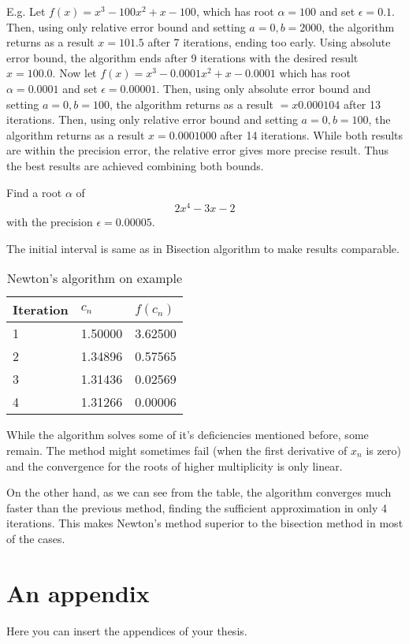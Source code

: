 \documentclass[
  digital, %
  table,   %
  nolof,     %
  nolot,     %
	draft, %
]{fithesis3}
\begin{document}
E.g. Let $f(x)=x^3-100x^2+x-100$, which has root $\alpha=100$ and set $\epsilon=0.1$. Then, using only relative error bound and setting $a=0, b=2000$, the algorithm returns as a result $x=101.5$ after 7 iterations, ending too early. Using absolute error bound, the algorithm ends after 9 iterations with the desired result $x=100.0$. 
Now let $f(x)=x^3-0.0001x^2+x-0.0001$ which has root $\alpha=0.0001$ and set $\epsilon=0.00001$. Then, using only absolute error bound and setting $a=0, b=100$, the algorithm returns as a result $=x0.000104$ after 13 iterations. Then, using only relative error bound and setting $a=0, b=100$, the algorithm returns as a result $x=0.0001000$ after 14 iterations. While both results are within the precision error, the relative error gives more precise result. Thus the best results are achieved combining both bounds.
\begin{example}
Find a root $\alpha$ of 
\begin{align}
      2x^{4} - 3x - 2
\end{align}
with the precision $\epsilon = 0.00005$.
\end{example}
The initial interval is same as in Bisection algorithm to make results comparable.
\FloatBarrier
\begin{table}[H]
  \begin{tabularx}{\textwidth}{lll}
    \toprule
    Iteration & $c_{n}$ & $f(c_{n})$\\
    \midrule
		1 & 1.50000 & 3.62500 \\
		2 & 1.34896 & 0.57565 \\
		3 & 1.31436 & 0.02569 \\
		4 & 1.31266 & 0.00006 \\
    \bottomrule
  \end{tabularx}
  \caption{Newton's algorithm on example}
  \label{tab:newt}
\end{table}

While the algorithm solves some of it's deficiencies mentioned before, some remain. The method might sometimes fail (when the first derivative of $x_{n}$ is zero) and the convergence for the roots of higher multiplicity is only linear.

On the other hand, as we can see from the table, the algorithm converges much faster than the previous method, finding the sufficient approximation in only 4 iterations. This makes Newton's method superior to the bisection method in most of the cases.


\printbibliography[heading=bibintoc]


  \makeatletter\thesis@blocks@clear\makeatother
  \printindex

\appendix %
\chapter{An appendix}
Here you can insert the appendices of your thesis.
\end{document}
